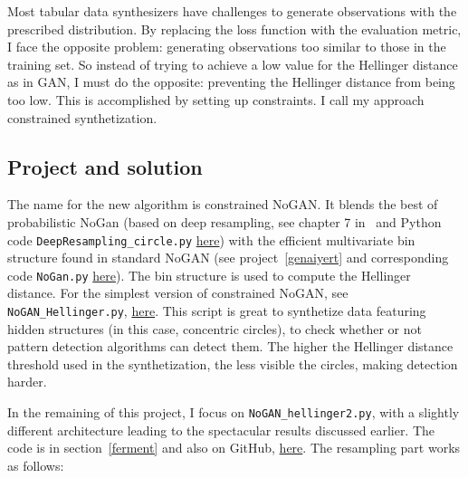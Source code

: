 \documentclass[oneside,10pt]{book}
\begin{document}
\noindent Most tabular data synthesizers have challenges to generate observations with the prescribed distribution. By replacing the loss function with the
 evaluation metric, I face the opposite problem: generating observations too similar to those in the training set. So instead of trying to achieve a low value
 for the Hellinger distance as in GAN, I must do the opposite:  preventing the Hellinger distance from being too low. This is
 accomplished by setting up constraints. I call my approach \textcolor{index}{constrained synthetization}. 

\subsection{Project and solution}

The name for the new algorithm is  \textcolor{index}{constrained NoGAN}. It blends the best of 
\textcolor{index}{probabilistic NoGan} (based on deep \textcolor{index}{resampling}, see 
chapter 7 in~\cite{vgmloptim} and Python code \texttt{DeepResampling\_circle.py}
\href{https://github.com/VincentGranville/Main/blob/main/DeepResampling_circle.py}{here}) with the
 efficient multivariate \textcolor{index}{bin structure} found in 
\textcolor{index}{standard NoGAN} 
(see project~\ref{genaiyert} and corresponding code \texttt{NoGan.py} \href{https://github.com/VincentGranville/Main/blob/main/NoGAN.py}{here}). 
The bin structure is used to compute the Hellinger distance.
For the simplest version of constrained NoGAN, see \texttt{NoGAN\_Hellinger.py}, \href{https://github.com/VincentGranville/Main/blob/main/NoGAN_Hellinger.py}{here}. 
This script is great to synthetize data featuring hidden structures (in this case, concentric circles), to check whether or not pattern detection algorithms 
can detect them. The higher the Hellinger distance threshold used in the synthetization, the less visible the circles, making
 detection harder.

In the remaining of this project, 
I focus on \texttt{NoGAN\_hellinger2.py}, with a slightly different architecture leading to the spectacular
 results discussed earlier. The code is in section~\ref{ferment} and also on GitHub,
 \href{https://github.com/VincentGranville/Main/blob/main/NoGAN_Hellinger2.py}{here}. The resampling part works as follows: 
\vspace{1ex}
\end{document}
